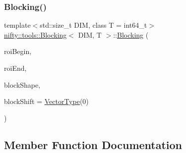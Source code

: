 \subsubsection{\texorpdfstring{Blocking()}{Blocking()}}
{\footnotesize\ttfamily template$<$std\+::size\+\_\+t D\+IM, class T  = int64\+\_\+t$>$ \\
\hyperlink{classnifty_1_1tools_1_1Blocking}{nifty\+::tools\+::\+Blocking}$<$ D\+IM, T $>$\+::\hyperlink{classnifty_1_1tools_1_1Blocking}{Blocking} (\begin{DoxyParamCaption}\item[{const \hyperlink{classnifty_1_1tools_1_1Blocking_a5f8df3d4cdf09803217d729a04018fb3}{Vector\+Type} \&}]{roi\+Begin,  }\item[{const \hyperlink{classnifty_1_1tools_1_1Blocking_a5f8df3d4cdf09803217d729a04018fb3}{Vector\+Type} \&}]{roi\+End,  }\item[{const \hyperlink{classnifty_1_1tools_1_1Blocking_a5f8df3d4cdf09803217d729a04018fb3}{Vector\+Type} \&}]{block\+Shape,  }\item[{const \hyperlink{classnifty_1_1tools_1_1Blocking_a5f8df3d4cdf09803217d729a04018fb3}{Vector\+Type} \&}]{block\+Shift = {\ttfamily \hyperlink{classnifty_1_1tools_1_1Blocking_a5f8df3d4cdf09803217d729a04018fb3}{Vector\+Type}(0)} }\end{DoxyParamCaption})\hspace{0.3cm}{\ttfamily [inline]}}



\subsection{Member Function Documentation}
\mbox{\label{classnifty_1_1tools_1_1Blocking_a09126c498d87974b9cabcae18c887b4f}} 
